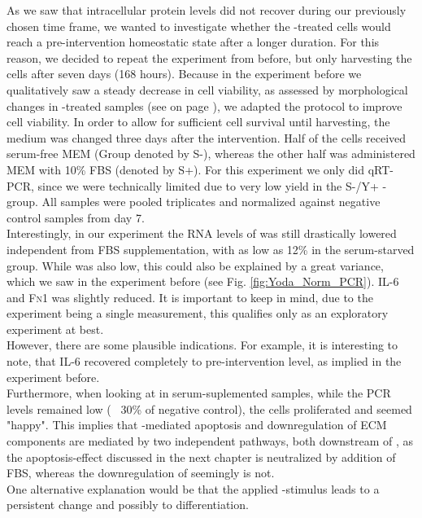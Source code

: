 As we saw that intracellular \colone{} protein levels did not recover during our previously chosen time frame, we wanted to investigate whether the \Yoda{}-treated cells would reach a pre-intervention homeostatic state after a longer duration. For this reason, we decided to repeat the experiment from before, but only harvesting the cells after seven days (168 hours). Because in the experiment before we qualitatively saw a steady decrease in cell viability, as assessed by morphological changes in \Yoda{}-treated samples (see on page \pageref{pic:Yoda_Apop}), we adapted the protocol to improve cell viability. In order to allow for sufficient cell survival until harvesting, the medium was changed three days after the intervention. Half of the cells received serum-free MEM\textalpha{} (Group denoted by S-), whereas the other half was administered MEM\textalpha{} with 10\% FBS (denoted by S+). For this experiment we only did qRT-PCR, since we were technically limited due to very low yield in the S-/Y+ - group. All samples were pooled triplicates and normalized against negative control samples from day 7.\\
Interestingly, in our experiment the RNA levels of \colone{} was still drastically lowered independent from FBS supplementation, with as low as 12\% in the serum-starved group. While \colthree{} was also low, this could also be explained by a great variance, which we saw in the experiment before (see Fig. \ref{fig:Yoda_Norm_PCR}). IL-6 and \textsc{Fn}1 was slightly reduced. It is important to keep in mind, due to the experiment being a single measurement, this qualifies only as an exploratory experiment at best.\\
However, there are some plausible indications. For example, it is interesting to note, that IL-6 recovered completely to pre-intervention level, as implied in the experiment before. \\
Furthermore, when looking at \colone{} in serum-suplemented samples, while the PCR levels remained low (~ 30\% of negative control), the cells proliferated and seemed "happy". This implies that \Piezo{}-mediated apoptosis and downregulation of ECM components are mediated by two independent pathways, both downstream of \Piezo{}, as the apoptosis-effect discussed in the next chapter is neutralized by addition of FBS, whereas the downregulation of \colone{} seemingly is not.\\
One alternative explanation would be that the applied \Yoda{}-stimulus leads to a persistent change and possibly to differentiation.\par

